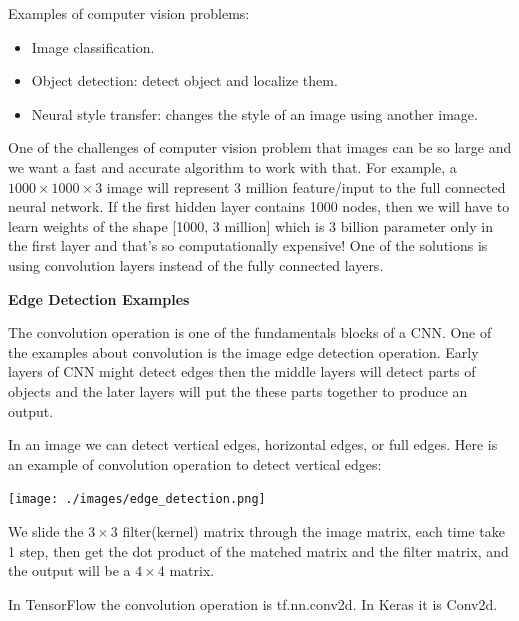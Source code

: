 \documentclass{article}
\begin{document}
\bigskip

\noindent Examples of computer vision problems:

\begin{itemize}
    \item Image classification.
    \item Object detection: detect object and localize them.
    \item Neural style transfer: changes the style of an image using another image.
\end{itemize}

\noindent One of the challenges of computer vision problem that images can be so large and we want a fast and accurate algorithm to work with that. For example, a \(1000 \times 1000 \times 3\) image will represent 3 million feature/input to the full connected neural network. If the first hidden layer contains 1000 nodes, then we will have to learn weights of the shape [1000, 3 million] which is 3 billion parameter only in the first layer and that's so computationally expensive! One of the solutions is using convolution layers instead of the fully connected layers.

\bigskip

\noindent \textbf{Edge Detection Examples}

\noindent The convolution operation is one of the fundamentals blocks of a CNN. One of the examples about convolution is the image edge detection operation. Early layers of CNN might detect edges then the middle layers will detect parts of objects and the later layers will put the these parts together to produce an output.

\bigskip

\noindent In an image we can detect vertical edges, horizontal edges, or full edges. Here is an example of convolution operation to detect vertical edges:

\begin{center}
\texttt{[image: ./images/edge\_detection.png]}
\end{center}

\noindent We slide the \(3 \times 3\) filter(kernel) matrix through the image matrix, each time take 1 step, then get the dot product of the matched matrix and the filter matrix, and the output will be a \(4 \times 4\) matrix.

\bigskip

\noindent In TensorFlow the convolution operation is tf.nn.conv2d. In Keras it is Conv2d.

\bigskip
\end{document}
